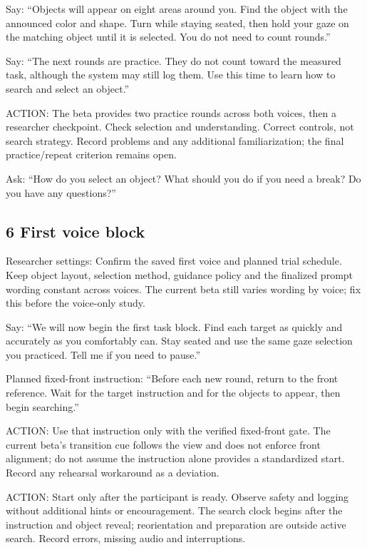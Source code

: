 Say: ``Objects will appear on eight areas around you. Find the object
with the announced color and shape. Turn while staying seated, then hold
your gaze on the matching object until it is selected. You do not need
to count rounds.''

Say: ``The next rounds are practice. They do not count toward the
measured task, although the system may still log them. Use this time to
learn how to search and select an object.''

ACTION: The beta provides two practice rounds across both voices, then a
researcher checkpoint. Check selection and understanding. Correct
controls, not search strategy. Record problems and any additional
familiarization; the final practice/repeat criterion remains open.

Ask: ``How do you select an object? What should you do if you need a
break? Do you have any questions?''

\subsection{6 First voice block}\label{first-voice-block}

Researcher settings: Confirm the saved first voice and planned trial
schedule. Keep object layout, selection method, guidance policy and the
finalized prompt wording constant across voices. The current beta still
varies wording by voice; fix this before the voice-only study.

Say: ``We will now begin the first task block. Find each target as
quickly and accurately as you comfortably can. Stay seated and use the
same gaze selection you practiced. Tell me if you need to pause.''

Planned fixed-front instruction: ``Before each new round, return to the
front reference. Wait for the target instruction and for the objects to
appear, then begin searching.''

ACTION: Use that instruction only with the verified fixed-front gate.
The current beta's transition cue follows the view and does not enforce
front alignment; do not assume the instruction alone provides a
standardized start. Record any rehearsal workaround as a deviation.

ACTION: Start only after the participant is ready. Observe safety and
logging without additional hints or encouragement. The search clock
begins after the instruction and object reveal; reorientation and
preparation are outside active search. Record errors, missing audio and
interruptions.

